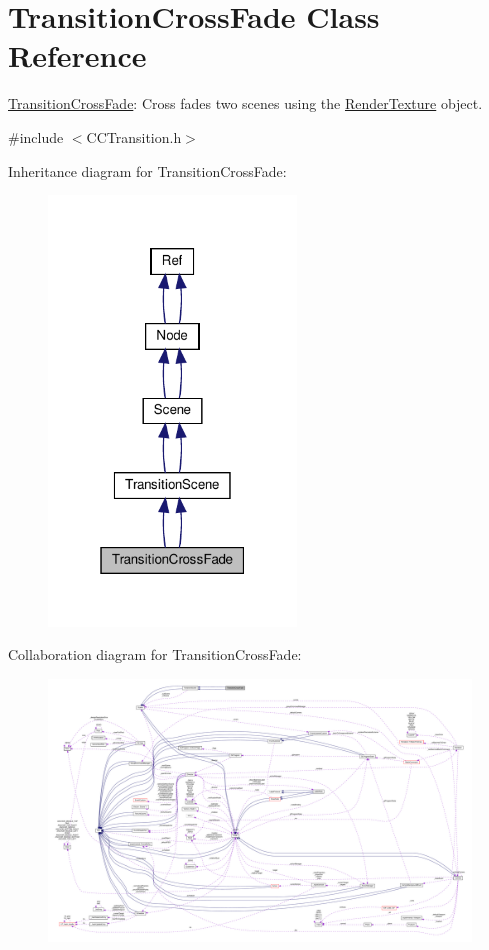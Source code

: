 \hypertarget{classTransitionCrossFade}{}\section{Transition\+Cross\+Fade Class Reference}
\label{classTransitionCrossFade}


\hyperlink{classTransitionCrossFade}{Transition\+Cross\+Fade}\+: Cross fades two scenes using the \hyperlink{classRenderTexture}{Render\+Texture} object.  




{\ttfamily \#include $<$C\+C\+Transition.\+h$>$}



Inheritance diagram for Transition\+Cross\+Fade\+:
\nopagebreak
\begin{figure}[H]
\begin{center}
\leavevmode
\includegraphics[width=187pt]{classTransitionCrossFade__inherit__graph}
\end{center}
\end{figure}


Collaboration diagram for Transition\+Cross\+Fade\+:
\nopagebreak
\begin{figure}[H]
\begin{center}
\leavevmode
\includegraphics[width=350pt]{classTransitionCrossFade__coll__graph}
\end{center}
\end{figure}
